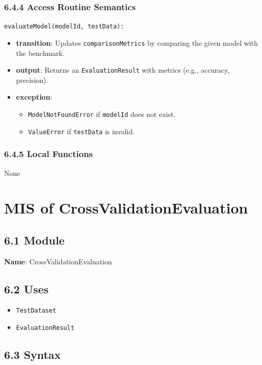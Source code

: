 \documentclass[12pt, titlepage]{article}
\begin{document}
\subsubsection{6.4.4 Access Routine Semantics}
\noindent \texttt{evaluateModel(modelId, testData):}
\begin{itemize}
    \item \textbf{transition}: Updates \texttt{comparisonMetrics} by comparing the given model with the benchmark.
    \item \textbf{output}: Returns an \texttt{EvaluationResult} with metrics (e.g., accuracy, precision).
    \item \textbf{exception}:
    \begin{itemize}
        \item \texttt{ModelNotFoundError} if \texttt{modelId} does not exist.
        \item \texttt{ValueError} if \texttt{testData} is invalid.
    \end{itemize}
\end{itemize}

\subsubsection{6.4.5 Local Functions}
None

\newpage


\section{MIS of CrossValidationEvaluation}
\label{sec:CrossValidationEvaluation}

\subsection{6.1 Module}
\textbf{Name}: CrossValidationEvaluation

\subsection{6.2 Uses}
\begin{itemize}
    \item \texttt{TestDataset}
    \item \texttt{EvaluationResult}
\end{itemize}

\subsection{6.3 Syntax}
\end{document}
